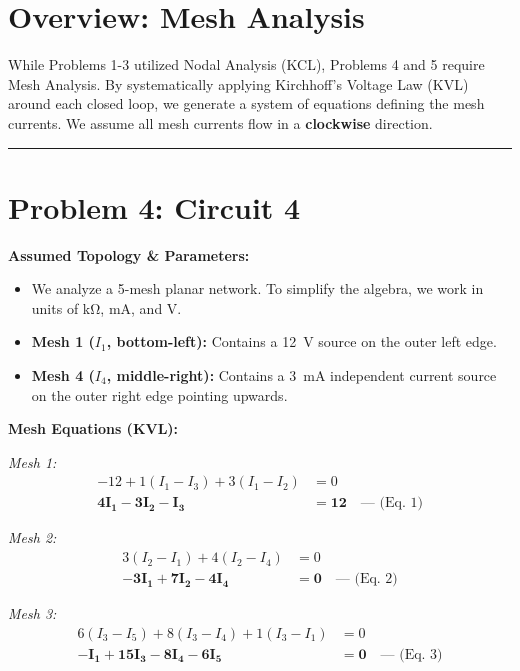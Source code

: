 \documentclass[11pt]{article}
\begin{document}
\section*{Overview: Mesh Analysis}
While Problems 1-3 utilized Nodal Analysis (KCL), Problems 4 and 5 require Mesh Analysis. By systematically applying Kirchhoff's Voltage Law (KVL) around each closed loop, we generate a system of equations defining the mesh currents. We assume all mesh currents flow in a \textbf{clockwise} direction.

\hrule
\vspace{1em}

\section*{Problem 4: Circuit 4}

\textbf{Assumed Topology \& Parameters:}
\begin{itemize}
  \item We analyze a 5-mesh planar network. To simplify the algebra, we work in units of \si{\kilo\ohm}, \si{\milli\ampere}, and \si{\volt}.
  \item \textbf{Mesh 1 ($I_1$, bottom-left):} Contains a \SI{12}{\volt} source on the outer left edge.
  \item \textbf{Mesh 4 ($I_4$, middle-right):} Contains a \SI{3}{\milli\ampere} independent current source on the outer right edge pointing upwards.
\end{itemize}

\textbf{Mesh Equations (KVL):}

\textit{Mesh 1:}
\begin{align*}
  -12 + 1(I_1 - I_3) + 3(I_1 - I_2) &= 0 \\
  \mathbf{4I_1 - 3I_2 - I_3} &\mathbf{= 12} \quad \text{--- (Eq. 1)}
\end{align*}

\textit{Mesh 2:}
\begin{align*}
  3(I_2 - I_1) + 4(I_2 - I_4) &= 0 \\
  \mathbf{-3I_1 + 7I_2 - 4I_4} &\mathbf{= 0} \quad \text{--- (Eq. 2)}
\end{align*}

\textit{Mesh 3:}
\begin{align*}
  6(I_3 - I_5) + 8(I_3 - I_4) + 1(I_3 - I_1) &= 0 \\
  \mathbf{-I_1 + 15I_3 - 8I_4 - 6I_5} &\mathbf{= 0} \quad \text{--- (Eq. 3)}
\end{align*}
\end{document}

